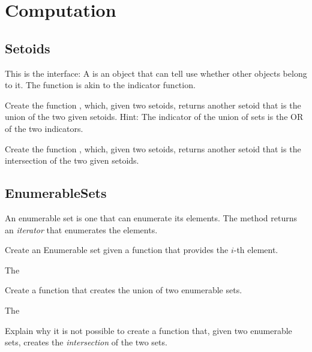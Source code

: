 
\chapter{Computation}


\section{Setoids}

This is the \Setoid interface:
%
%
A \Setoid is an object that can tell use whether other objects belong to it.
The  function is akin to the indicator function.


\begin{codeexercise}
  Create the function , which, given two setoids, returns another setoid that is the union of the two given setoids.
%
%
  Hint: The indicator of the union of sets is the OR of the two indicators.
\end{codeexercise}

\begin{codeexercise}
  Create the function , which, given two setoids, returns another setoid that is the intersection of the two given setoids.
%
\end{codeexercise}


\section{EnumerableSets}

%
An enumerable set is one that can enumerate its elements.
The method  returns an \emph{iterator} that enumerates the elements.

\begin{codeexercise}
  Create an Enumerable set given a function that provides the $i$-th element.

  The
%
\end{codeexercise}

\begin{codeexercise}
  Create a function that creates the union of two enumerable sets.

  The
%
\end{codeexercise}

\begin{codeexercise}
  Explain why it is not possible to create a function that, given two enumerable sets,
  creates the \emph{intersection} of the two sets.
\end{codeexercise}

